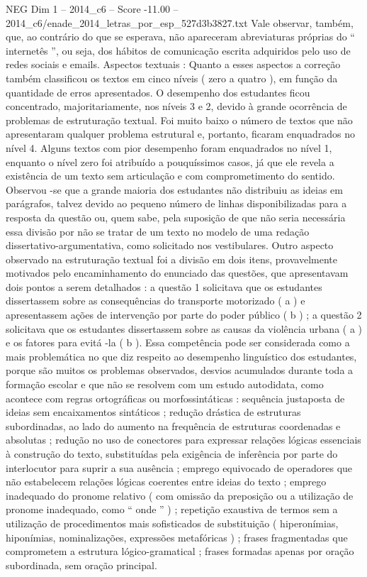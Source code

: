 \begin{textsample}{NEG Dim 1 – 2014\_c6 – Score -11.00 – 2014\_c6/enade\_2014\_letras\_por\_esp\_527d3b3827.txt}
Vale observar, também, que, ao contrário do que se esperava, não apareceram abreviaturas próprias do “ internetês ”, ou seja, dos hábitos de comunicação escrita adquiridos pelo uso de redes sociais e emails.
Aspectos textuais : Quanto a esses aspectos a correção também classificou os textos em cinco níveis ( zero a quatro ), em função da quantidade de erros apresentados.
O desempenho dos estudantes ficou concentrado, majoritariamente, nos níveis 3 e 2, devido à grande ocorrência de problemas de estruturação textual.
Foi muito baixo o número de textos que não apresentaram qualquer problema estrutural e, portanto, ficaram enquadrados no nível 4.
Alguns textos com pior desempenho foram enquadrados no nível 1, enquanto o nível zero foi atribuído a pouquíssimos casos, já que ele revela a existência de um texto sem articulação e com comprometimento do sentido.
Observou -se que a grande maioria dos estudantes não distribuiu as ideias em parágrafos, talvez devido ao pequeno número de linhas disponibilizadas para a resposta da questão ou, quem sabe, pela suposição de que não seria necessária essa divisão por não se tratar de um texto no modelo de uma redação dissertativo-argumentativa, como solicitado nos vestibulares.
Outro aspecto observado na estruturação textual foi a divisão em dois itens, provavelmente motivados pelo encaminhamento do enunciado das questões, que apresentavam dois pontos a serem detalhados : a questão 1 solicitava que os estudantes dissertassem sobre as consequências do transporte motorizado ( a ) e apresentassem ações de intervenção por parte do poder público ( b ) ; a questão 2 solicitava que os estudantes dissertassem sobre as causas da violência urbana ( a ) e os fatores para evitá -la ( b ).
Essa competência pode ser considerada como a mais problemática no que diz respeito ao desempenho linguístico dos estudantes, porque são muitos os problemas observados, desvios acumulados durante toda a formação escolar e que não se resolvem com um estudo autodidata, como acontece com regras ortográficas ou morfossintáticas : sequência justaposta de ideias sem encaixamentos sintáticos ; redução drástica de estruturas subordinadas, ao lado do aumento na frequência de estruturas coordenadas e absolutas ; redução no uso de conectores para expressar relações lógicas essenciais à construção do texto, substituídas pela exigência de inferência por parte do interlocutor para suprir a sua ausência ; emprego equivocado de operadores que não estabelecem relações lógicas coerentes entre ideias do texto ; emprego inadequado do pronome relativo ( com omissão da preposição ou a utilização de pronome inadequado, como “ onde ” ) ; repetição exaustiva de termos sem a utilização de procedimentos mais sofisticados de substituição ( hiperonímias, hiponímias, nominalizações, expressões metafóricas ) ; frases fragmentadas que comprometem a estrutura lógico-gramatical ; frases formadas apenas por oração subordinada, sem oração principal.

\end{textsample}
